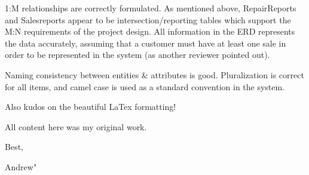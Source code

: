 \documentclass{article}
\begin{document}
\begin{tcolorbox}[colback=secondarycolor, colframe=primarycolor, title=\textbf{Peer Review 2 - Andrew Mathena}]
\vspace{0.2cm}

1:M relationships are correctly formulated. As mentioned above, RepairReports and Salesreports appear to be intersection/reporting tables which support the M:N requirements of the project design. All information in the ERD represents the data accurately, assuming that a customer must have at least one sale in order to be represented in the system (as another reviewer pointed out).

\vspace{0.2cm}

Naming consistency between entities \& attributes is good. Pluralization is correct for all items, and camel case is used as a standard convention in the system.

\vspace{0.2cm}

Also kudos on the beautiful LaTex formatting!

\vspace{0.2cm}

All content here was my original work.

\vspace{0.2cm}

Best,

\vspace{0.2cm}

Andrew"
\vspace{0.2cm}
\end{tcolorbox}
\end{document}
